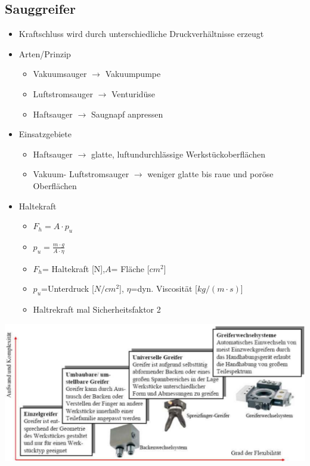 \begin{minipage}{0.5\linewidth}
    \subsection{Sauggreifer}
    \begin{itemize}
        \item Kraftschluss wird durch unterschiedliche Druckverhältnisse erzeugt
        \item Arten/Prinzip
        \begin{itemize}
            \item Vakuumsauger $\rightarrow$ Vakuumpumpe
            \item Luftstromsauger $\rightarrow$ Venturidüse
            \item Haftsauger $\rightarrow$ Saugnapf anpressen
        \end{itemize}
        \item Einsatzgebiete
        \begin{itemize}
            \item Haftsauger $\rightarrow$ glatte, luftundurchlässige Werkstückoberflächen
            \item Vakuum- Luftstromsauger $\rightarrow$ weniger glatte bis raue und poröse Oberflächen
        \end{itemize}
        \item Haltekraft
        \begin{itemize}
            \item[] $ F_h=A\cdot p_u$
            \item[] $ p_u= \frac{m\cdot g}{A \cdot \eta}$
            \item[] $F_h$= Haltekraft [N],$A$= Fläche [$cm^2$]
            \item[] $p_u$=Unterdruck [$N/cm^2$], $\eta$=dyn. Viscosität [$kg/(m\cdot s)$]
            \item[] Haltrekraft mal Sicherheitsfaktor 2
        \end{itemize}
    \end{itemize}

\includegraphics[width=\linewidth]{./bilder/GreiferAuswahl}
\end{minipage}
